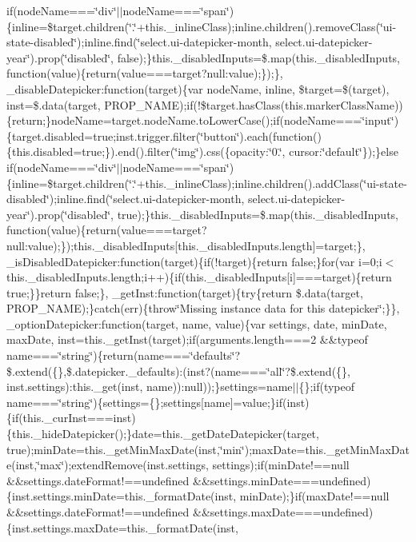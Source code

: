 {{\begin{DoxyParamCaption}
if(node\+Name===\char`\"{}div\char`\"{}$\vert$$\vert$node\+Name===\char`\"{}span\char`\"{})\{inline=\$target.\+children(\char`\"{}.\char`\"{}+this.\+\_\+inline\+Class);inline.\+children().\+remove\+Class(\char`\"{}ui-\/state-\/disabled\char`\"{});inline.\+find(\char`\"{}select.\+ui-\/datepicker-\/month, select.\+ui-\/datepicker-\/year\char`\"{}).\+prop(\char`\"{}disabled\char`\"{}, false);\}this.\+\_\+disabled\+Inputs=\$.\+map(this.\+\_\+disabled\+Inputs, function(value)\{return(value===target?null\+:value);\});\}, \+\_\+disable\+Datepicker\+:function(target)\{var node\+Name, inline, \$target=\$(target), inst=\$.\+data(target, P\+R\+O\+P\+\_\+\+N\+A\+M\+E);if(!\$target.\+has\+Class(this.\+marker\+Class\+Name))\{return;\}node\+Name=target.\+node\+Name.\+to\+Lower\+Case();if(node\+Name===\char`\"{}input\char`\"{})\{target.\+disabled=true;inst.\+trigger.\+filter(\char`\"{}button\char`\"{}).\+each(function()\{this.\+disabled=true;\}).\+end().\+filter(\char`\"{}img\char`\"{}).\+css(\{opacity\+:\char`\"{}0.\char`\"{}, cursor\+:\char`\"{}default\char`\"{}\});\}else if(node\+Name===\char`\"{}div\char`\"{}$\vert$$\vert$node\+Name===\char`\"{}span\char`\"{})\{inline=\$target.\+children(\char`\"{}.\char`\"{}+this.\+\_\+inline\+Class);inline.\+children().\+add\+Class(\char`\"{}ui-\/state-\/disabled\char`\"{});inline.\+find(\char`\"{}select.\+ui-\/datepicker-\/month, select.\+ui-\/datepicker-\/year\char`\"{}).\+prop(\char`\"{}disabled\char`\"{}, true);\}this.\+\_\+disabled\+Inputs=\$.\+map(this.\+\_\+disabled\+Inputs, function(value)\{return(value===target?null\+:value);\});this.\+\_\+disabled\+Inputs\mbox{[}this.\+\_\+disabled\+Inputs.\+length\mbox{]}=target;\}, \+\_\+is\+Disabled\+Datepicker\+:function(target)\{if(!target)\{return false;\}for(var i=0;i$<$ this.\+\_\+disabled\+Inputs.\+length;i++)\{if(this.\+\_\+disabled\+Inputs\mbox{[}i\mbox{]}===target)\{return true;\}\}return false;\}, \+\_\+get\+Inst\+:function(target)\{try\{return \$.\+data(target, P\+R\+O\+P\+\_\+\+N\+A\+M\+E);\}catch(err)\{throw\char`\"{}\+Missing instance data for this datepicker\char`\"{};\}\}, \+\_\+option\+Datepicker\+:function(target, name, value)\{var settings, date, min\+Date, max\+Date, inst=this.\+\_\+get\+Inst(target);if(arguments.\+length===2 \&\&typeof name===\char`\"{}string\char`\"{})\{return(name===\char`\"{}defaults\char`\"{}?\$.\+extend(\{\},\$.\+datepicker.\+\_\+defaults)\+:(inst?(name===\char`\"{}all\char`\"{}?\$.\+extend(\{\}, inst.\+settings)\+:this.\+\_\+get(inst, name))\+:null));\}settings=name$\vert$$\vert$\{\};if(typeof name===\char`\"{}string\char`\"{})\{settings=\{\};settings\mbox{[}name\mbox{]}=value;\}if(inst)\{if(this.\+\_\+cur\+Inst===inst)\{this.\+\_\+hide\+Datepicker();\}date=this.\+\_\+get\+Date\+Datepicker(target, true);min\+Date=this.\+\_\+get\+Min\+Max\+Date(inst,\char`\"{}min\char`\"{});max\+Date=this.\+\_\+get\+Min\+Max\+Date(inst,\char`\"{}max\char`\"{});extend\+Remove(inst.\+settings, settings);if(min\+Date!==null \&\&settings.\+date\+Format!==undefined \&\&settings.\+min\+Date===undefined)\{inst.\+settings.\+min\+Date=this.\+\_\+format\+Date(inst, min\+Date);\}if(max\+Date!==null \&\&settings.\+date\+Format!==undefined \&\&settings.\+max\+Date===undefined)\{inst.\+settings.\+max\+Date=this.\+\_\+format\+Date(inst, 
\end{DoxyParamCaption}}}
